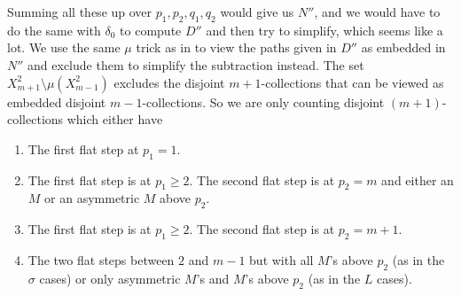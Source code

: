 \documentclass[11pt]{article}
\theoremstyle{definition}
\theoremstyle{definition}
\theoremstyle{plain}
\theoremstyle{plain}
\theoremstyle{plain}
\theoremstyle{definition}
\begin{document}
Summing all these up over $p_1,p_2,q_1,q_2$ would give us $N''$, and we would have to do the same with $\delta_0$ to compute $D''$ and then try to simplify, which seems like a lot. We use the same $\mu$ trick as in \cite{meckes_magnitude_2019} to view the paths given in $D''$ as embedded in $N''$ and exclude them to simplify the subtraction instead. The set $X_{m+1}^2\setminus\mu\left(X_{m-1}^2\right)$ excludes the disjoint $m+1$-collections that can be viewed as embedded disjoint $m-1$-collections. So we are only counting disjoint $(m+1)$-collections which either have
\begin{enumerate}
\item The first flat step at $p_1=1$.
\item The first flat step is at $p_1 \geq 2$. The second flat step is at $p_2 = m$ and either an $M$ or an asymmetric $M$ above $p_2$.
\item The first flat step is at $p_1 \geq 2$. The second flat step is at $p_2 = m+1$.
\item The two flat steps between $2$ and $m-1$ but with all $M$'s above $p_2$ (as in the $\sigma$ cases) or only asymmetric $M$'s and $M$'s above $p_2$ (as in the $L$ cases).
\end{enumerate}
\end{document}
